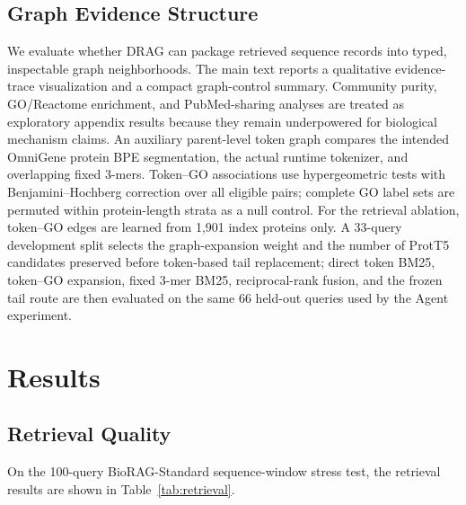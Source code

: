 \documentclass[11pt]{article}
\begin{document}
\subsection{Graph Evidence Structure}

We evaluate whether DRAG can package retrieved sequence records into typed, inspectable graph neighborhoods. The main text reports a qualitative evidence-trace visualization and a compact graph-control summary. Community purity, GO/Reactome enrichment, and PubMed-sharing analyses are treated as exploratory appendix results because they remain underpowered for biological mechanism claims. An auxiliary parent-level token graph compares the intended OmniGene protein BPE segmentation, the actual runtime tokenizer, and overlapping fixed 3-mers. Token--GO associations use hypergeometric tests with Benjamini--Hochberg correction over all eligible pairs; complete GO label sets are permuted within protein-length strata as a null control. For the retrieval ablation, token--GO edges are learned from 1,901 index proteins only. A 33-query development split selects the graph-expansion weight and the number of ProtT5 candidates preserved before token-based tail replacement; direct token BM25, token--GO expansion, fixed 3-mer BM25, reciprocal-rank fusion, and the frozen tail route are then evaluated on the same 66 held-out queries used by the Agent experiment.

\section{Results}

\subsection{Retrieval Quality}

On the 100-query BioRAG-Standard sequence-window stress test, the retrieval results are shown in Table~\ref{tab:retrieval}.

\begin{table}[t]
\centering
\caption{Retrieval quality on the 100-query BioRAG-Standard sequence-window stress test. This evaluates local fragment recovery and candidate-pool behavior, not held-out biological homology search.}
\label{tab:retrieval}
\end{table}
\end{document}
